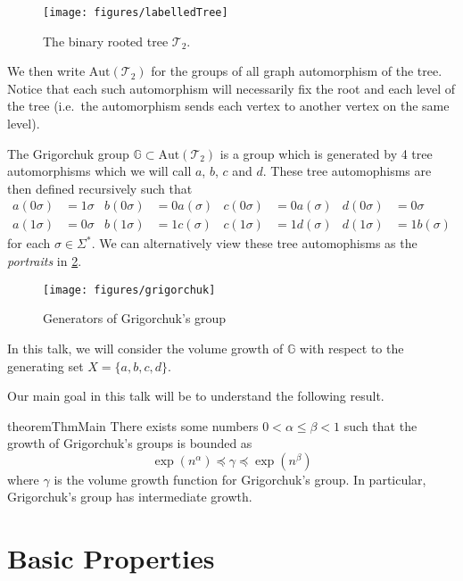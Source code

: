 \documentclass[11pt,a4paper,reqno]{amsart}
\theoremstyle{plain}
\theoremstyle{definition}
\theoremstyle{definition}
\renewcommand\leq\leqslant
\begin{document}
\begin{figure}[ht!]
  \centering
  \texttt{[image: figures/labelledTree]}
  \caption{The binary rooted tree $\mathcal T_2$.}\label{fig:bintree}
\end{figure}

We then write $\mathrm{Aut}(\mathcal T_2)$ for the groups of all graph automorphism of the tree.
Notice that each such automorphism will necessarily fix the root and each level of the tree
 (i.e.~the automorphism sends each vertex to another vertex on the same level).

The Grigorchuk group $\mathbb G \subset \mathrm{Aut}(\mathcal T_2)$ is a group which is generated by 4 tree automorphisms which we will call $a$, $b$, $c$ and $d$.
These tree automophisms are then defined recursively such that
\begin{align*}
    a(0\sigma) &= 1 \sigma &
    b(0\sigma) &= 0 a(\sigma) &
    c(0\sigma) &= 0 a(\sigma) &
    d(0\sigma) &= 0\sigma
    \\
    a(1\sigma) &= 0 \sigma &
    b(1\sigma) &= 1 c(\sigma) &
    c(1\sigma) &= 1 d(\sigma) &
    d(1\sigma) &= 1 b(\sigma)
\end{align*}
for each $\sigma\in \Sigma^*$.
We can alternatively view these tree automophisms as the \emph{portraits} in \cref{fig:grig-generators}.

\begin{figure}[ht!]
	\centering
	\texttt{[image: figures/grigorchuk]}
	\caption{Generators of Grigorchuk's group}
	\label{fig:grig-generators}
\end{figure}

In this talk, we will consider the volume growth of $\mathbb G$ with respect to the generating set $X = \{a,b,c,d\}$.

Our main goal in this talk will be to understand the following result.

\begin{restatable*}{theorem}{ThmMain}\label{thm:main}
  There exists some numbers $0 < \alpha \leq \beta< 1$ such that the growth of Grigorchuk's groups is bounded as
  \[
   \exp(n^\alpha)
   \preccurlyeq
   \gamma
   \preccurlyeq
   \exp(n^\beta)
  \]
  where $\gamma$ is the volume growth function for Grigorchuk's group.
  In particular, Grigorchuk's group has intermediate growth.
\end{restatable*}

\section{Basic Properties}
\end{document}
